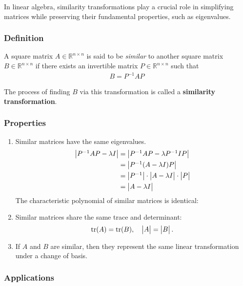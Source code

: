 \documentclass[12pt]{article}
\numberwithin{equation}{subsubsection}
\begin{document}
In linear algebra, similarity transformations play a crucial role in simplifying matrices while preserving their fundamental properties, such as eigenvalues.

\subsubsection{Definition}

A square matrix $A \in \mathbb{R}^{n \times n} $ is said to be \textit{similar} to another square matrix $B \in \mathbb{R}^{n \times n}$ if there exists an invertible matrix $P \in \mathbb{R}^{n \times n}$ such that
\begin{align}
	B = P^{-1}AP 
\end{align}

The process of finding $ B $ via this transformation is called a \textbf{similarity transformation}.

\subsubsection{Properties}
\begin{enumerate}
	\item Similar matrices have the same eigenvalues.
	      \begin{align}
	      	\begin{vmatrix}P^{-1}AP - \lambda I\end{vmatrix} & = \begin{vmatrix}P^{-1}AP - \lambda P^{-1}IP\end{vmatrix}                  \\
	      	                             & = \begin{vmatrix}P^{-1}(A - \lambda I)P\end{vmatrix}                       \\
	      	                             & = \begin{vmatrix}P^{-1}\end{vmatrix}\cdot\begin{vmatrix}A-\lambda I\end{vmatrix}\cdot\begin{vmatrix}P\end{vmatrix} \\
	      	                             & = \begin{vmatrix}A-\lambda I\end{vmatrix}                                  
	      \end{align}
	      The characteristic polynomial of similar matrices is identical:
	       
	\item Similar matrices share the same trace and determinant:
	      \begin{align}
	      	\mathrm{tr}(A) = \mathrm{tr}(B), \quad \begin{vmatrix}A\end{vmatrix} = \begin{vmatrix}B\end{vmatrix}. 
	      \end{align}
	\item If $ A $ and $ B $ are similar, then they represent the same linear transformation under a change of basis.
\end{enumerate}

\subsubsection{Applications}
\end{document}
